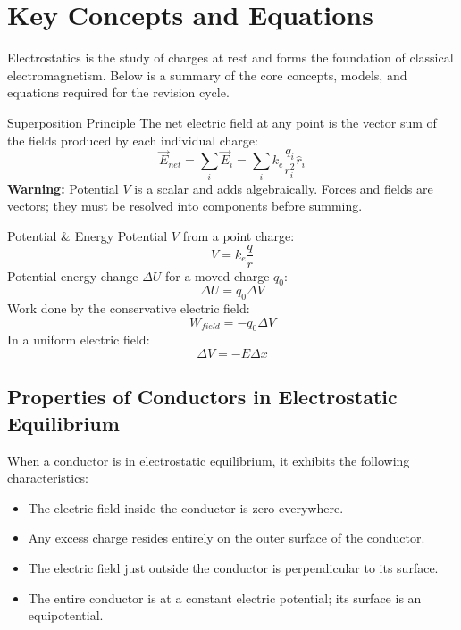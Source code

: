 \section*{Key Concepts and Equations}

Electrostatics is the study of charges at rest and forms the foundation of classical electromagnetism. Below is a summary of the core concepts, models, and equations required for the revision cycle.

\vspace{10pt}

\begin{conceptbox}{Superposition Principle}
The net electric field at any point is the vector sum of the fields produced by each individual charge:
\[ \vec{E}_{net} = \sum_i \vec{E}_i = \sum_i k_e \frac{q_i}{r_i^2} \hat{r}_i \]
\textbf{Warning:} Potential $V$ is a scalar and adds algebraically. Forces and fields are vectors; they must be resolved into components before summing.
\end{conceptbox}

\vspace{15pt}

\begin{equationbox}{Potential \& Energy}
Potential $V$ from a point charge:
\[ V = k_e \frac{q}{r} \]
Potential energy change $\Delta U$ for a moved charge $q_0$:
\[ \Delta U = q_0 \Delta V \]
Work done by the conservative electric field:
\[ W_{field} = -q_0 \Delta V \]
In a uniform electric field:
\[ \Delta V = -E \Delta x \]
\end{equationbox}

\vspace{10pt}
\subsection*{Properties of Conductors in Electrostatic Equilibrium}
When a conductor is in electrostatic equilibrium, it exhibits the following characteristics:
\begin{itemize}
    \item The electric field inside the conductor is zero everywhere.
    \item Any excess charge resides entirely on the outer surface of the conductor.
    \item The electric field just outside the conductor is perpendicular to its surface.
    \item The entire conductor is at a constant electric potential; its surface is an equipotential.
\end{itemize}
